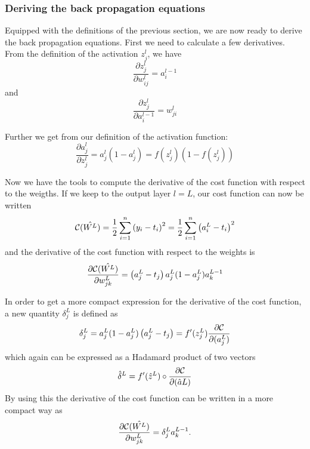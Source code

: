 \documentclass[a4paper,12pt]{article}
\begin{document}
\subsubsection{Deriving the back propagation equations}
Equipped with the definitions of the previous section, we are now ready to derive the back propagation equations. First we need to calculate a few derivatives.\newline
From the definition of the activation $z_j^l$, we have
\begin{equation}
    \frac{\partial z_j^l}{\partial w_{ij}^l} = a_i^{l-1}
\end{equation}
and
\begin{equation}
    \frac{\partial z_j^l}{\partial a_i^{l-1}} = w_{ji}^l
\end{equation}

Further we get from our definition of the activation function:
\begin{equation}
    \frac{\partial a_j^l}{\partial z_j^{l}} = a_j^l(1-a_j^l)=f(z_j^l)(1-f(z_j^l))
\end{equation}

Now we have the tools to compute the derivative of the cost function with respect to the weigths. If we keep to the output layer $l=L$, our cost function can now be written
\begin{equation}
    {\cal C}(\hat{W^L})  =  \frac{1}{2}\sum_{i=1}^n\left(y_i - t_i\right)^2=\frac{1}{2}\sum_{i=1}^n\left(a_i^L - t_i\right)^2
\end{equation}
and the derivative of the cost function with respect to the weights is
\begin{equation}
    \frac{\partial{\cal C}(\hat{W^L})}{\partial w_{jk}^L}  =  \left(a_j^L - t_j\right)a_j^L(1-a_j^L)a_k^{L-1}
\end{equation}

In order to get a more compact expression for the derivative of the cost function, a new quantity $\delta_j^L$ is defined as
\begin{equation}
    \delta_j^L = a_j^L(1-a_j^L)\left(a_j^L - t_j\right) = f'(z_j^L)\frac{\partial {\cal C}}{\partial (a_j^L)}
\end{equation}
which again can be expressed as a Hadamard product of two vectors
\begin{equation}
    \hat{\delta}^L = f'(\hat{z}^L)\circ\frac{\partial {\cal C}}{\partial (\hat{a}L)}
\end{equation}
By using this the derivative of the cost function can be written in a more compact way as
\begin{equation}
    \frac{\partial{\cal C}(\hat{W^L})}{\partial w_{jk}^L}  =  \delta_j^La_k^{L-1}.
\end{equation}
\end{document}
